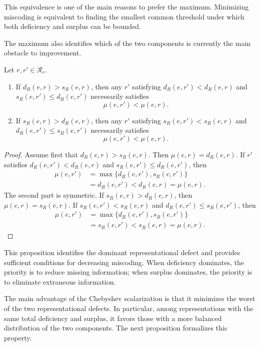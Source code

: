 This equivalence is one of the main reasons to prefer the maximum. Minimizing miscoding is equivalent to finding the smallest common threshold under which both deficiency and surplus can be bounded.

The maximum also identifies which of the two components is currently the main obstacle to improvement.

\begin{proposition}
\label{prop:bottleneck_principle_section}
Let $r,r'\in\mathcal R_e$.
\begin{enumerate}
    \item If $d_R(e,r)>s_R(e,r)$, then any $r'$ satisfying $d_R(e,r') < d_R(e,r)$ and $s_R(e,r') \le d_R(e,r')$ necessarily satisfies
    \[
    \mu(e,r')<\mu(e,r).
    \]
    \item If $s_R(e,r)>d_R(e,r)$, then any $r'$ satisfying $s_R(e,r') < s_R(e,r)$ and $d_R(e,r') \le s_R(e,r')$ necessarily satisfies
    \[
    \mu(e,r')<\mu(e,r).
    \]
\end{enumerate}
\end{proposition}
\begin{proof}
Assume first that $d_R(e,r)>s_R(e,r)$. Then $\mu(e,r)=d_R(e,r)$. If $r'$ satisfies $d_R(e,r') < d_R(e,r)$ and 
$s_R(e,r')\le d_R(e,r')$, then
\[
\begin{aligned}
\mu(e,r')
& = \max\{d_R(e,r'),s_R(e,r')\} \\
& = d_R(e,r') < d_R(e,r) = \mu(e,r).
\end{aligned}
\]
The second part is symmetric. If $s_R(e,r)>d_R(e,r)$, then $\mu(e,r)=s_R(e,r)$. If $s_R(e,r')<s_R(e,r)$ and $d_R(e,r')\le s_R(e,r')$, then
\[
\begin{aligned}
\mu(e,r')
& = \max\{d_R(e,r'),s_R(e,r')\} \\
& = s_R(e,r') < s_R(e,r) = \mu(e,r).
\end{aligned}
\]
\end{proof}

This proposition identifies the dominant representational defect and provides sufficient conditions for decreasing miscoding. When deficiency dominates, the priority is to reduce missing information; when surplus dominates, the priority is to eliminate extraneous information.

The main advantage of the Chebyshev scalarization is that it minimizes the worst of the two representational defects. In particular, among representations with the same total deficiency and surplus, it favors those with a more balanced distribution of the two components. The next proposition formalizes this property.

